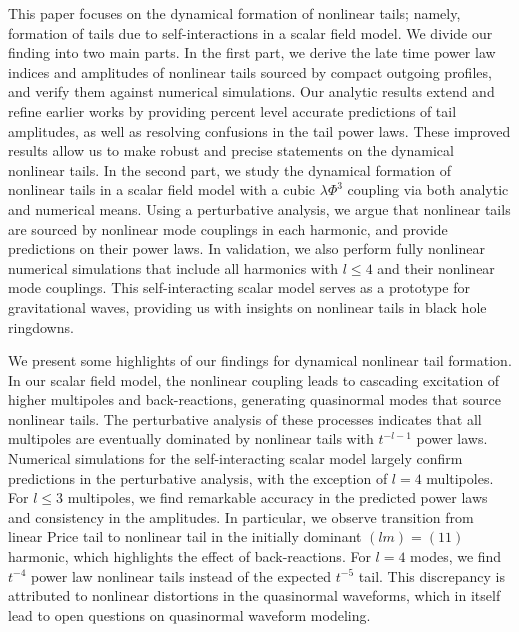 This paper focuses on the dynamical formation of nonlinear tails; namely, formation of tails due to self-interactions in a scalar field model.
We divide our finding into two main parts.
In the first part, we derive the late time power law indices and amplitudes of nonlinear tails sourced by compact outgoing profiles, and verify them against numerical simulations.
Our analytic results extend and refine earlier works \cite{Okuzumi:2008ej,Lagos:2022otp,Cardoso:2024jme} by providing percent level accurate predictions of tail amplitudes, as well as resolving confusions in the tail power laws.
These improved results allow us to make robust and precise statements on the dynamical nonlinear tails. In the second part, we study the dynamical formation of nonlinear tails in a scalar field model with a cubic $\lambda \Phi^3$ coupling via both analytic and numerical means.
Using a perturbative analysis, we argue that nonlinear tails are sourced by nonlinear mode couplings in each harmonic, and provide predictions on their power laws.
In validation, we also perform fully nonlinear numerical simulations that include all harmonics with $l \leq 4$ and their nonlinear mode couplings.
This self-interacting scalar model serves as a prototype for gravitational waves, providing us with insights on nonlinear tails in black hole ringdowns.

We present some highlights of our findings for dynamical nonlinear tail formation.
In our scalar field model, the nonlinear coupling leads to cascading excitation of higher multipoles and back-reactions, generating quasinormal modes that source nonlinear tails.
The perturbative analysis of these processes indicates that all multipoles are eventually dominated by nonlinear tails with $t^{-l-1}$ power laws.
Numerical simulations for the self-interacting scalar model largely confirm predictions in the perturbative analysis, with the exception of $l=4$ multipoles.
For $l \leq 3$ multipoles, we find remarkable accuracy in the predicted power laws and consistency in the amplitudes.
In particular, we observe transition from linear Price tail to nonlinear tail in the initially dominant $(lm)=(11)$ harmonic, which highlights the effect of back-reactions.
For $l=4$ modes, we find $t^{-4}$ power law nonlinear tails instead of the expected $t^{-5}$ tail.
This discrepancy is attributed to nonlinear distortions in the quasinormal waveforms, which in itself lead to open questions on quasinormal waveform modeling.





